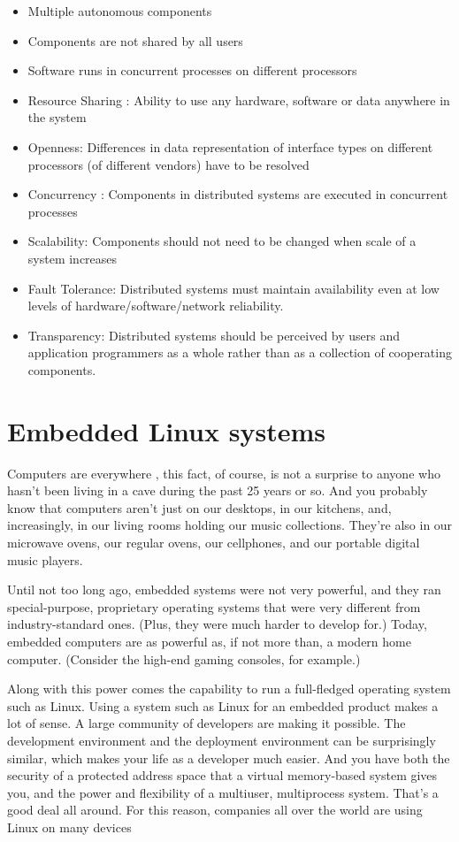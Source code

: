 \begin{itemize}
\item  Multiple autonomous components
\item Components are not shared by all users
\item Software runs in concurrent processes on different processors
\item Resource Sharing : Ability to use any hardware, software or data anywhere in
the system
\item Openness: Differences in data representation of interface types on different
processors (of different vendors) have to be resolved
\item Concurrency : Components in distributed systems are executed in concurrent
processes
\item Scalability: Components should not need to be changed when scale of a system
increases
\item Fault Tolerance: Distributed systems must maintain availability even at low
levels of hardware/software/network reliability.
\item Transparency: Distributed systems should be perceived by users and
application programmers as a whole rather than as a collection of cooperating components.
\end{itemize}

\section{Embedded Linux systems}

Computers are everywhere , this fact, of course, is not a surprise to anyone 
who hasn't been living in a cave during the past 25 years or so. And you
probably know that computers aren't just on our desktops, in our kitchens, and, 
increasingly, in our living rooms holding our music collections. They're also 
in our microwave ovens, our regular ovens, our cellphones, and our portable 
digital music players.

Until not too long ago, embedded systems were not very powerful, and they ran
special-purpose, proprietary operating systems that were very different from
industry-standard ones. (Plus, they were much harder to develop for.) Today,
embedded computers are as powerful as, if not more than, a modern home
computer. (Consider the high-end gaming consoles, for example.)

Along with this power comes the capability to run a full-fledged operating
system such as Linux. Using a system such as Linux for an embedded product
makes a lot of sense. A large community of developers are making it possible.
The development environment and the deployment environment can be surprisingly
similar, which makes your life as a developer much easier. And you have both
the security of a protected address space that a virtual memory-based system
gives you, and the power and flexibility of a multiuser, multiprocess system.
That's a good deal all around. For this reason, companies all over the world
are using Linux on many devices

